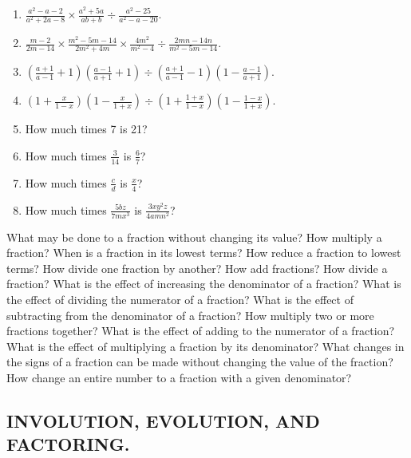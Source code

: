 \documentclass{book}
\begin{document}
\begin{enumerate}
\item $\displaystyle \frac{a^2 - a - 2}{a^2 + 2a - 8} \times
\frac{a^2 + 5a}{ab + b} \div \frac{a^2 - 25}{a^2 - a - 20}$.

\item $\displaystyle \frac{m - 2}{2m - 14} \times \frac{m^2 - 5m -
14}{2m^2 + 4m} \times \frac{4m^2}{m^2 - 4} \div \frac{2mn -
14n}{m^2 - 5m - 14}$.

\item $ \displaystyle \left(\frac{a+1}{a-1} + 1\right)
\left(\frac{a-1}{a+1} + 1\right)
   \div
  \left(\frac{a+1}{a-1} - 1\right) \left(1 - \frac{a-1}{a+1}\right)$.

\item $\displaystyle \left(1 + \frac{x}{1-x}\right) \left(1 -
\frac{x}{1+x}\right) \div \left(1 + \frac{1+x}{1-x}\right) \left(1
- \frac{1-x}{1+x}\right)$.

\item How much times 7 is 21?

\item How much times $\frac{3}{14}$ is $\frac{6}{7}$?

\item How much times $\displaystyle \frac{c}{d}$ is $\displaystyle
\frac{x}{4}$?

\item How much times $\displaystyle \frac{5bz}{7mx^3}$ is
$\displaystyle \frac{3xy^2z}{4amn^2}$?

\end{enumerate}

What may be done to a fraction without changing its value? How
multiply a fraction? When is a fraction in its lowest terms? How
reduce a fraction to lowest terms? How divide one fraction by
another? How add fractions? How divide a fraction? What is the
effect of increasing the denominator of a fraction? What is the
effect of dividing the numerator of a fraction? What is the effect
of subtracting from the denominator of a fraction? How multiply
two or more fractions together? What is the effect of adding to
the numerator of a fraction? What is the effect of multiplying a
fraction by its denominator? What changes in the signs of a
fraction can be made without changing the value of the fraction?
How change an entire number to a fraction with a given
denominator?

\subsection*{INVOLUTION, EVOLUTION, AND FACTORING.}
\end{document}
